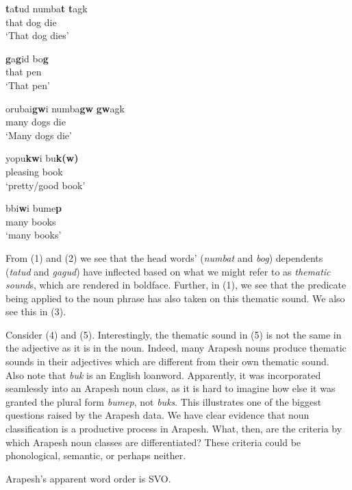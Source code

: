\documentclass[pdftex,12pt,letterpaper]{article}
\let\ipa\textipa
\begin{document}
\begin{exe}

\ex
\gll \textbf{t}a\textbf{t}ud numba\textbf{t} \textbf{t}agk \\
that dog die \\
\trans `That dog dies'

\ex
\gll \textbf{g}a\textbf{g}id bo\textbf{g}\\
that pen\\
\trans `That pen'

\ex
\gll orubai\textbf{gw}i numba\textbf{gw} \textbf{gw}agk \\
many dogs die \\
\trans `Many dogs die'

\ex
\gll yopu\textbf{kw}i bu\textbf{k(w)\ipa{\super ?}} \\
pleasing book\\
\trans `pretty/good book'

\ex
\gll b\ipa{@r@h@}bi\textbf{w}i bume\textbf{p} \\
many books\\
\trans `many books'

\end{exe}

\noindent From (1) and (2) we see that the head words' (\emph{numbat} and \emph{bog}) dependents (\emph{tatud} and \emph{gagud}) have inflected based on what we might refer to as \emph{thematic sound}s, which are rendered in boldface. Further, in (1), we see that the predicate being applied to the noun phrase has also taken on this thematic sound. We also see this in (3).

Consider (4) and (5). Interestingly, the thematic sound in (5) is not the same in the adjective as it is in the noun. Indeed, many Arapesh nouns produce thematic sounds in their adjectives which are different from their own thematic sound. Also note that \emph{buk} is an English loanword. Apparently, it was incorporated seamlessly into an Arapesh noun class, as it is hard to imagine how else it was granted the plural form \emph{bumep}, not \emph{buks}. This illustrates one of the biggest questions raised by the Arapesh data. We have clear evidence that noun classification is a productive process in Arapesh. What, then, are the criteria by which Arapesh noun classes are differentiated? These criteria could be phonological, semantic, or perhaps neither.

Arapesh's apparent word order is SVO.
\end{document}
